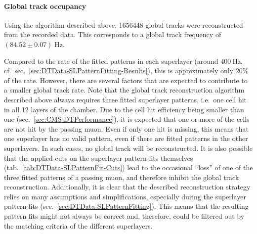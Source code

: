 \paragraph{Global track occupancy}
Using the algorithm described above, \num{1656448} global tracks were reconstructed from the recorded data. This corresponds to a global track frequency of $(84.52 \pm 0.07)\;\si{\hertz}$.
\par Compared to the rate of the fitted patterns in each superlayer (around $\SI{400}{\hertz}$, cf.\ sec.\ \ref{sec:DTData-SLPatternFitting-Results}), this is approximately only $20\%$ of the rate. However, there are several factors that are expected to contribute to a smaller global track rate. Note that the global track reconstruction algorithm described above always requires three fitted superlayer patterns, i.e.\ one cell hit in all 12 layers of the chamber. Due to the cell hit efficiency being smaller than one (sec.\ \ref{sec:CMS-DTPerformance}), it is expected that one or more of the cells are not hit by the passing muon. Even if only one hit is missing, this means that one superlayer has no valid pattern, even if there are fitted patterns in the other superlayers. In such cases, no global track will be reconstructed. It is also possible that the applied cuts on the superlayer pattern fits themselves (tab.\ \ref{tab:DTData-SLPatternFit-Cuts}) lead to the occasional \enquote{loss} of one of the three fitted patterns of a passing muon, and therefore inhibit the global track reconstruction. Additionally, it is clear that the described reconstruction strategy relies on many assumptions and simplifications, especially during the superlayer pattern fits (sec.\ \ref{sec:DTData-SLPatternFitting}). This means that the resulting pattern fits might not always be correct and, therefore, could be filtered out by the matching criteria of the different superlayers.
